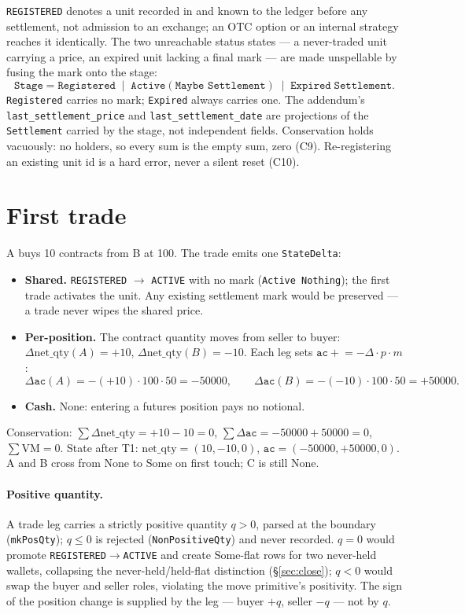 \documentclass[11pt]{article}
\newcommand{\ac}{\texttt{ac}}
\newcommand{\netq}{\mathrm{net\_qty}}
\newcommand{\code}[1]{\texttt{#1}}
\newcommand{\mult}{m}
\begin{document}
\code{REGISTERED} denotes a unit recorded in and known to the ledger before any settlement, not
admission to an exchange; an OTC option or an internal strategy reaches it identically. The two
unreachable status states --- a never-traded unit carrying a price, an expired unit lacking a final
mark --- are made unspellable by fusing the mark onto the stage:
\[
\code{Stage}=\code{Registered}\;\mid\;\code{Active}(\code{Maybe Settlement})\;\mid\;
\code{Expired}\;\code{Settlement}.
\]
\code{Registered} carries no mark; \code{Expired} always carries one. The addendum's
\code{last\_settlement\_price} and \code{last\_settlement\_date} are projections of the
\code{Settlement} carried by the stage, not independent fields. Conservation holds vacuously:
no holders, so every sum is the empty sum, zero (C9). Re-registering an existing unit id is a hard
error, never a silent reset (C10).

\section{First trade}

A buys 10 contracts from B at 100. The trade emits one \code{StateDelta}:

\begin{itemize}
\item \textbf{Shared.} \code{REGISTERED} $\to$ \code{ACTIVE} with no mark
(\code{Active Nothing}); the first trade activates the unit. Any existing settlement mark would be
preserved --- a trade never wipes the shared price.
\item \textbf{Per-position.} The contract quantity moves from seller to buyer:
$\Delta\netq(A)=+10$, $\Delta\netq(B)=-10$. Each leg sets $\ac\mathrel{+}=-\Delta\cdot p\cdot\mult$:
\[
\Delta\ac(A) = -(+10)\cdot 100\cdot 50 = -50000,\qquad
\Delta\ac(B) = -(-10)\cdot 100\cdot 50 = +50000.
\]
\item \textbf{Cash.} None: entering a futures position pays no notional.
\end{itemize}

\noindent Conservation:
$\sum\Delta\netq = +10-10 = 0$, $\sum\Delta\ac = -50000+50000 = 0$, $\sum\mathrm{VM}=0$. State after
T1: $\netq=(10,-10,0)$, $\ac=(-50000,+50000,0)$. A and B cross from $\mathrm{None}$ to
$\mathrm{Some}$ on first touch; C is still $\mathrm{None}$.

\paragraph{Positive quantity.} A trade leg carries a strictly positive quantity $q>0$, parsed at
the boundary (\code{mkPosQty}); $q\le 0$ is rejected (\code{NonPositiveQty}) and never recorded.
$q=0$ would promote \code{REGISTERED}$\to$\code{ACTIVE} and create $\mathrm{Some}$-flat rows for two
never-held wallets, collapsing the never-held/held-flat distinction (\S\ref{sec:close}); $q<0$ would
swap the buyer and seller roles, violating the move primitive's positivity. The sign of the position
change is supplied by the leg --- buyer $+q$, seller $-q$ --- not by $q$.
\end{document}
